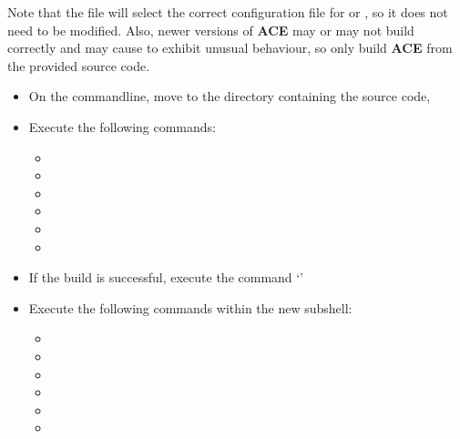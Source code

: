 Note that the file  will select the correct
configuration file for \osx{} or \win{}, so it does not need to be modified.
Also, newer versions of \textbf{ACE} may or may not build correctly and may cause
\mplusm{} to exhibit unusual behaviour, so only build \textbf{ACE} from the provided
source code.
\begin{itemize}
\item On the command\longDash{}line, move to the directory containing the \mplusm{} source
code, 
\item\exSp{}Execute the following commands:
\begin{itemize}
\item {}
\item\exSp{}
\item\exSp{}
\item\exSp{}
\item\exSp{}
\item\exSp{}
\end{itemize}
\item\exSp{}If the build is successful, execute the command `'
\item\exSp{}Execute the following commands within the new subshell:
\begin{itemize}
\item {}
\item\exSp{}
\item\exSp{}
\item\exSp{}
\item\exSp{}
\item\exSp{}
\end{itemize}
\end{itemize}
\tertiaryEnd
{}
